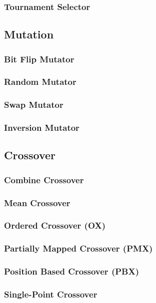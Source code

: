     \subsubsection{Tournament Selector}
    \label{sec:keen:operators:selection:tournament}
      \Blindtext
  \subsection{Mutation}
  \label{sec:keen:operators:mutation}
    \subsubsection{Bit Flip Mutator}
    \label{sec:keen:operators:mutation:bit_flip}
      \Blindtext
    \subsubsection{Random Mutator}
    \label{sec:keen:operators:mutation:simple}
      \Blindtext
    \subsubsection{Swap Mutator}
    \label{sec:keen:operators:mutation:swap}
      \Blindtext
    \subsubsection{Inversion Mutator}
    \label{sec:keen:operators:mutation:inversion}
      \Blindtext
  \subsection{Crossover}
  \label{sec:keen:operators:crossover}
    \subsubsection{Combine Crossover}
    \label{sec:keen:operators:crossover:combine}
      \Blindtext
    \subsubsection{Mean Crossover}
    \label{sec:keen:operators:crossover:mean}
      \Blindtext
    \subsubsection{Ordered Crossover (OX)}
    \label{sec:keen:operators:crossover:ordered}
      \Blindtext
    \subsubsection{Partially Mapped Crossover (PMX)}
    \label{sec:keen:operators:crossover:partially_mapped}
      \Blindtext
    \subsubsection{Position Based Crossover (PBX)}
    \label{sec:keen:operators:crossover:position_based}
      \Blindtext
    \subsubsection{Single-Point Crossover}
    \label{sec:keen:operators:crossover:single_point}
      \Blindtext
